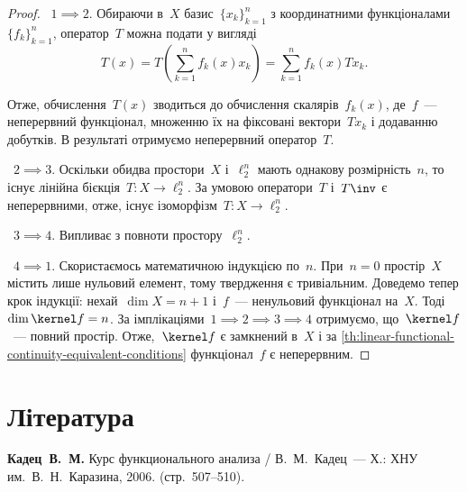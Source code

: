\begin{proof}
   ~$1 \implies 2$. Обираючи в~$X$ базис~$\{x_k\}_{k = 1}^n$ з координатними функціоналами~$\{f_k\}_{k = 1}^n$, оператор~$T$ можна подати у вигляді
    \begin{equation*}
        T(x) = T \left( \sum_{k = 1}^n f_k(x) x_k \right) = \sum_{k = 1}^n f_k(x) T x_k. 
    \end{equation*}
    
    Отже, обчислення~$T(x)$ зводиться до обчислення скалярів~$f_k(x)$, де~$f$~--- неперервний функціонал, множенню їх на фіксовані вектори~$Tx_k$ і додаванню добутків. В результаті отримуємо неперервний оператор~$T$.
    
   ~$2 \implies 3$. Оскільки обидва простори~$X$ і~$\ell_2^n$ мають однакову розмірність~$n$, то існує лінійна бієкція~$T: X \to \ell_2^n$. За умовою оператори~$T$ і~$T\inv$ є неперервними, отже, існує ізоморфізм~$T: X \to \ell_2^n$.
    
   ~$3 \implies 4$. Випливає з повноти простору~$\ell_2^n$.

   ~$4 \implies 1$. Скористаємось математичною індукцією по~$n$. При~$n = 0$ простір~$X$ містить лише нульовий елемент, тому твердження є тривіальним. Доведемо тепер крок індукції: нехай~$\dim X = n + 1$ і~$f$~--- ненульовий функціонал на~$X$. Тоді~$\dim \kernel f = n$. За імплікаціями~$1 \implies 2 \implies 3 \implies 4$ отримуємо, що~$\kernel f$~--- повний простір. Отже,~$\kernel f$ є замкнений в~$X$ і за \cref{th:linear-functional-continuity-equivalent-conditions} функціонал~$f$ є неперервним.
\end{proof}

\section{Література}

\begin{enumerate}[label={[\arabic*]}]
\item \textbf{Кадец~В.~М.}
Курс функционального анализа /
В.~М.~Кадец~---
Х.: ХНУ им.~В.~Н.~Каразина, 2006. (стр.~507--510).
\end{enumerate}
